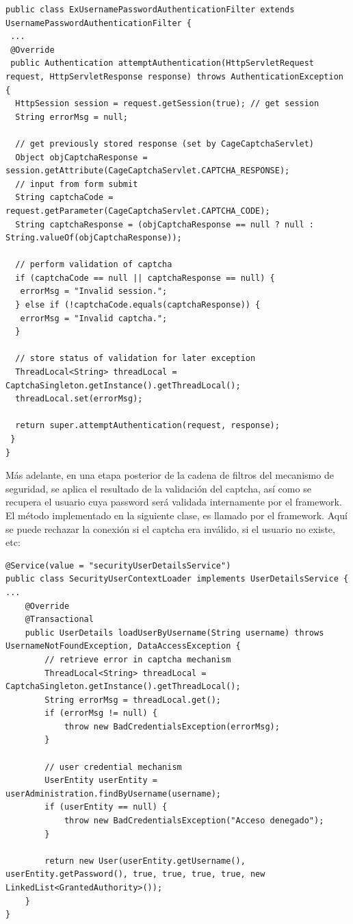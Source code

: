 \documentclass[letter]{article}
\begin{document}
\begin{lstlisting}
public class ExUsernamePasswordAuthenticationFilter extends UsernamePasswordAuthenticationFilter {
 ...
 @Override
 public Authentication attemptAuthentication(HttpServletRequest request, HttpServletResponse response) throws AuthenticationException {
  HttpSession session = request.getSession(true); // get session
  String errorMsg = null;

  // get previously stored response (set by CageCaptchaServlet)
  Object objCaptchaResponse = session.getAttribute(CageCaptchaServlet.CAPTCHA_RESPONSE);
  // input from form submit
  String captchaCode = request.getParameter(CageCaptchaServlet.CAPTCHA_CODE); 
  String captchaResponse = (objCaptchaResponse == null ? null : String.valueOf(objCaptchaResponse));

  // perform validation of captcha
  if (captchaCode == null || captchaResponse == null) {
   errorMsg = "Invalid session.";
  } else if (!captchaCode.equals(captchaResponse)) {
   errorMsg = "Invalid captcha.";
  }

  // store status of validation for later exception
  ThreadLocal<String> threadLocal = CaptchaSingleton.getInstance().getThreadLocal();
  threadLocal.set(errorMsg);

  return super.attemptAuthentication(request, response);
 }
}
\end{lstlisting}
Más adelante, en una etapa posterior de la cadena de filtros del mecanismo de seguridad, se aplica el resultado de la validación del captcha, así como se recupera el usuario cuya password será validada internamente por el framework. El método implementado en la siguiente clase, es llamado por el framework. Aquí se puede rechazar la conexión si el captcha era inválido, si el usuario no existe, etc:
\begin{lstlisting}
@Service(value = "securityUserDetailsService")
public class SecurityUserContextLoader implements UserDetailsService {
...
    @Override
    @Transactional
    public UserDetails loadUserByUsername(String username) throws UsernameNotFoundException, DataAccessException {
        // retrieve error in captcha mechanism
        ThreadLocal<String> threadLocal = CaptchaSingleton.getInstance().getThreadLocal();
        String errorMsg = threadLocal.get();
        if (errorMsg != null) {
            throw new BadCredentialsException(errorMsg);
        }

        // user credential mechanism
        UserEntity userEntity = userAdministration.findByUsername(username);
        if (userEntity == null) {
            throw new BadCredentialsException("Acceso denegado");
        }

        return new User(userEntity.getUsername(), userEntity.getPassword(), true, true, true, true, new LinkedList<GrantedAuthority>());
    }
}
\end{lstlisting}
\end{document}
